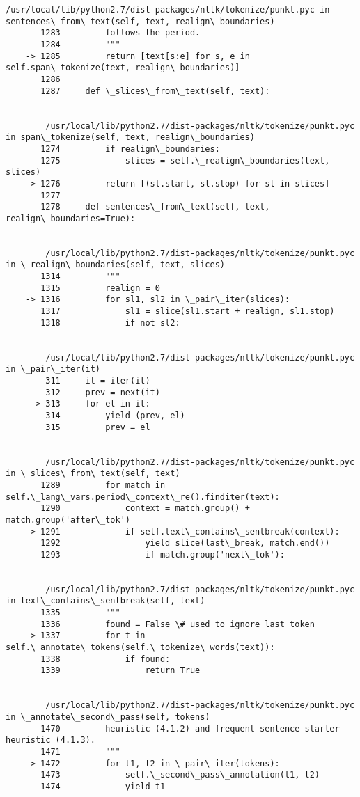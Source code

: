 \documentclass[11pt]{article}
\begin{document}
\begin{Verbatim}[commandchars=\\\{\}]
        /usr/local/lib/python2.7/dist-packages/nltk/tokenize/punkt.pyc in sentences\_from\_text(self, text, realign\_boundaries)
       1283         follows the period.
       1284         """
    -> 1285         return [text[s:e] for s, e in self.span\_tokenize(text, realign\_boundaries)]
       1286 
       1287     def \_slices\_from\_text(self, text):


        /usr/local/lib/python2.7/dist-packages/nltk/tokenize/punkt.pyc in span\_tokenize(self, text, realign\_boundaries)
       1274         if realign\_boundaries:
       1275             slices = self.\_realign\_boundaries(text, slices)
    -> 1276         return [(sl.start, sl.stop) for sl in slices]
       1277 
       1278     def sentences\_from\_text(self, text, realign\_boundaries=True):


        /usr/local/lib/python2.7/dist-packages/nltk/tokenize/punkt.pyc in \_realign\_boundaries(self, text, slices)
       1314         """
       1315         realign = 0
    -> 1316         for sl1, sl2 in \_pair\_iter(slices):
       1317             sl1 = slice(sl1.start + realign, sl1.stop)
       1318             if not sl2:


        /usr/local/lib/python2.7/dist-packages/nltk/tokenize/punkt.pyc in \_pair\_iter(it)
        311     it = iter(it)
        312     prev = next(it)
    --> 313     for el in it:
        314         yield (prev, el)
        315         prev = el


        /usr/local/lib/python2.7/dist-packages/nltk/tokenize/punkt.pyc in \_slices\_from\_text(self, text)
       1289         for match in self.\_lang\_vars.period\_context\_re().finditer(text):
       1290             context = match.group() + match.group('after\_tok')
    -> 1291             if self.text\_contains\_sentbreak(context):
       1292                 yield slice(last\_break, match.end())
       1293                 if match.group('next\_tok'):


        /usr/local/lib/python2.7/dist-packages/nltk/tokenize/punkt.pyc in text\_contains\_sentbreak(self, text)
       1335         """
       1336         found = False \# used to ignore last token
    -> 1337         for t in self.\_annotate\_tokens(self.\_tokenize\_words(text)):
       1338             if found:
       1339                 return True


        /usr/local/lib/python2.7/dist-packages/nltk/tokenize/punkt.pyc in \_annotate\_second\_pass(self, tokens)
       1470         heuristic (4.1.2) and frequent sentence starter heuristic (4.1.3).
       1471         """
    -> 1472         for t1, t2 in \_pair\_iter(tokens):
       1473             self.\_second\_pass\_annotation(t1, t2)
       1474             yield t1



\end{Verbatim}
\end{document}
